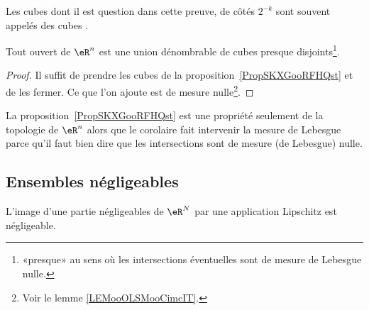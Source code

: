 Les cubes dont il est question dans cette preuve, de côtés \( 2^{-k}\) sont souvent appelés des cubes .

\begin{corollary}     \label{CorTHDQooWMSbJe}
	Tout ouvert de \( \eR^n\) est une union dénombrable de cubes presque disjoints\footnote{«presque» au sens où les intersections éventuelles sont de mesure de Lebesgue nulle.}.
\end{corollary}

\begin{proof}
	Il suffit de prendre les cubes de la proposition~\ref{PropSKXGooRFHQst} et de les fermer. Ce que l'on ajoute est de mesure nulle\footnote{Voir le lemme \ref{LEMooOLSMooCimcIT}.}.
\end{proof}

\begin{remark}
	La proposition~\ref{PropSKXGooRFHQst} est une propriété seulement de la topologie de \( \eR^n\) alors que le corolaire fait intervenir la mesure de Lebesgue parce qu'il faut bien dire que les intersections sont de mesure (de Lebesgue) nulle.
\end{remark}

\subsection{Ensembles négligeables}

\begin{lemma}      \label{LemWHKJooGPuxEN}
	L'image d'une partie négligeables de \( \eR^N\) par une application Lipschitz est négligeable.
\end{lemma}

